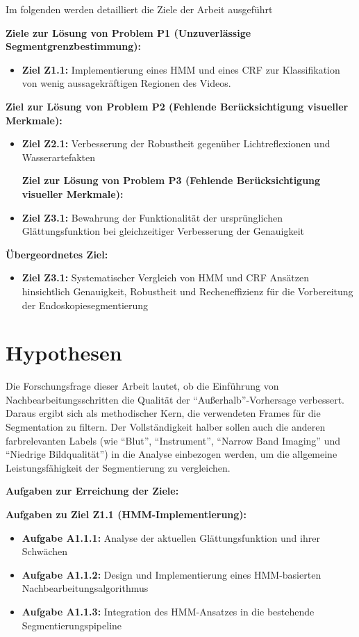 Im folgenden werden detailliert die Ziele der Arbeit ausgeführt

\textbf{Ziele zur Lösung von Problem P1 (Unzuverlässige Segmentgrenzbestimmung):}
\begin{itemize}
\item \textbf{Ziel Z1.1:} Implementierung eines HMM und eines CRF zur Klassifikation von wenig aussagekräftigen Regionen des Videos. 
\end{itemize}

\textbf{Ziel zur Lösung von Problem P2 (Fehlende Berücksichtigung visueller Merkmale):}
\begin{itemize}
\item \textbf{Ziel Z2.1:} Verbesserung der Robustheit gegenüber Lichtreflexionen und Wasserartefakten

\textbf{Ziel zur Lösung von Problem P3 (Fehlende Berücksichtigung visueller Merkmale):}
\item \textbf{Ziel Z3.1:} Bewahrung der Funktionalität der ursprünglichen Glättungsfunktion bei gleichzeitiger Verbesserung der Genauigkeit
\end{itemize}

\textbf{Übergeordnetes Ziel:}
\begin{itemize}
\item \textbf{Ziel Z3.1:} Systematischer Vergleich von HMM und CRF Ansätzen hinsichtlich Genauigkeit, Robustheit und Recheneffizienz für die Vorbereitung der Endoskopiesegmentierung
\end{itemize}

\section{Hypothesen}

Die Forschungsfrage dieser Arbeit lautet, ob die Einführung von Nachbearbeitungsschritten die Qualität der \enquote{Außerhalb}-Vorhersage verbessert. Daraus ergibt sich als methodischer Kern, die verwendeten Frames für die Segmentation zu filtern.
Der Vollständigkeit halber sollen auch die anderen farbrelevanten Labels (wie \enquote{Blut}, \enquote{Instrument}, \enquote{Narrow Band Imaging} und \enquote{Niedrige Bildqualität}) in die Analyse einbezogen werden, um die allgemeine Leistungsfähigkeit der Segmentierung zu vergleichen.

\textbf{Aufgaben zur Erreichung der Ziele:}

\textbf{Aufgaben zu Ziel Z1.1 (HMM-Implementierung):}
\begin{itemize}
\item \textbf{Aufgabe A1.1.1:} Analyse der aktuellen Glättungsfunktion und ihrer Schwächen
\item \textbf{Aufgabe A1.1.2:} Design und Implementierung eines HMM-basierten Nachbearbeitungsalgorithmus
\item \textbf{Aufgabe A1.1.3:} Integration des HMM-Ansatzes in die bestehende Segmentierungspipeline
\end{itemize}

